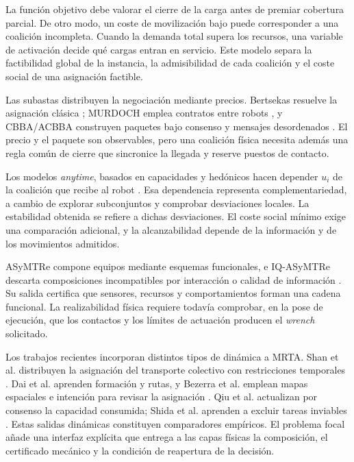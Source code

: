 La función objetivo debe valorar el cierre de la carga antes de premiar cobertura parcial. De otro modo, un coste de movilización bajo puede corresponder a una coalición incompleta. Cuando la demanda total supera los recursos, una variable de activación decide qué cargas entran en servicio. Este modelo separa la factibilidad global de la instancia, la admisibilidad de cada coalición y el coste social de una asignación factible.

Las subastas distribuyen la negociación mediante precios. Bertsekas resuelve la asignación clásica \parencite{bertsekas1988Auction}; MURDOCH emplea contratos entre robots \parencite{gerkeyMataric2002MURDOCH}, y CBBA/ACBBA construyen paquetes bajo consenso y mensajes desordenados \parencite{choiBrunetHow2009CBBA,johnson2011acbba}. El precio y el paquete son observables, pero una coalición física necesita además una regla común de cierre que sincronice la llegada y reserve puestos de contacto.

Los modelos \emph{anytime}, basados en capacidades y hedónicos hacen depender \(u_i\) de la coalición que recibe al robot \parencite{shehoryKraus1998Coalition,vigAdams2006Coalition,dutta2021hedonic}. Esa dependencia representa complementariedad, a cambio de explorar subconjuntos y comprobar desviaciones locales. La estabilidad obtenida se refiere a dichas desviaciones. El coste social mínimo exige una comparación adicional, y la alcanzabilidad depende de la información y de los movimientos admitidos.

ASyMTRe compone equipos mediante esquemas funcionales, e IQ-ASyMTRe descarta composiciones incompatibles por interacción o calidad de información \parencite{parkerTang2006ASyMTRe,zhangParker2013IQASyMTRe}. Su salida certifica que sensores, recursos y comportamientos forman una cadena funcional. La realizabilidad física requiere todavía comprobar, en la pose de ejecución, que los contactos y los límites de actuación producen el \emph{wrench} solicitado.

Los trabajos recientes incorporan distintos tipos de dinámica a MRTA. Shan et al.
distribuyen la asignación del transporte colectivo con restricciones temporales
\parencite{shan2024collectiveTransport}. Dai et al. aprenden formación y rutas, y
Bezerra et al. emplean mapas espaciales e intención para revisar la asignación
\parencite{dai2024dynamicCoalition,bezerra2025dynamicCoalition}. Qiu et al.
actualizan por consenso la capacidad consumida; Shida et al. aprenden a excluir
tareas inviables \parencite{qiu2024payloadConsumption,shida2025infeasibleTasks}.
Estas salidas dinámicas constituyen comparadores empíricos. El problema focal añade una interfaz explícita que entrega a las capas físicas la composición, el certificado mecánico y la condición de reapertura de la decisión.

